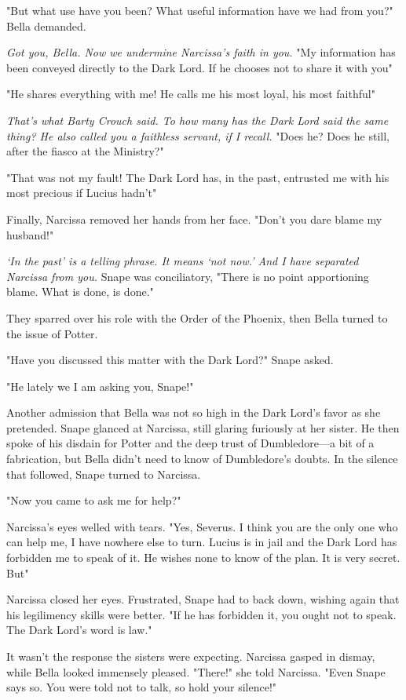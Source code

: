 "But what use have you been? What useful information have we had from you?" Bella demanded.

\emph{Got you, Bella. Now we undermine Narcissa's faith in you.} "My information has been conveyed directly to the Dark Lord. If he chooses not to share it with you{\el}"

"He shares everything with me! He calls me his most loyal, his most faithful{\el}"

\emph{That's what Barty Crouch said. To how many has the Dark Lord said the same thing? He also called you a faithless servant, if I recall.} "Does he? Does he still, after the fiasco at the Ministry?"

"That was not my fault! The Dark Lord has, in the past, entrusted me with his most precious{\el} if Lucius hadn't{\el}"

Finally, Narcissa removed her hands from her face. "Don't you dare blame my husband!"

\emph{`In the past' is a telling phrase. It means `not now.' And I have separated Narcissa from you.} Snape was conciliatory, "There is no point apportioning blame. What is done, is done."

They sparred over his role with the Order of the Phoenix, then Bella turned to the issue of Potter.

"Have you discussed this matter with the Dark Lord?" Snape asked.

"He{\el} lately we{\el} I am asking you, Snape!"

Another admission that Bella was not so high in the Dark Lord's favor as she pretended. Snape glanced at Narcissa, still glaring furiously at her sister. He then spoke of his disdain for Potter and the deep trust of Dumbledore—a bit of a fabrication, but Bella didn't need to know of Dumbledore's doubts. In the silence that followed, Snape turned to Narcissa.

"Now{\el} you came to ask me for help?"

Narcissa's eyes welled with tears. "Yes, Severus. I think you are the only one who can help me, I have nowhere else to turn. Lucius is in jail and{\el} the Dark Lord has forbidden me to speak of it. He wishes none to know of the plan. It is very{\el} secret. But{\el}"

Narcissa closed her eyes. Frustrated, Snape had to back down, wishing again that his legilimency skills were better. "If he has forbidden it, you ought not to speak. The Dark Lord's word is law."

It wasn't the response the sisters were expecting. Narcissa gasped in dismay, while Bella looked immensely pleased. "There!" she told Narcissa. "Even Snape says so. You were told not to talk, so hold your silence!"

